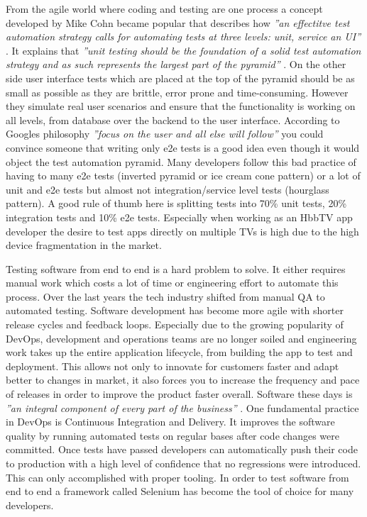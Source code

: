 From the agile world where coding and testing are one process a concept developed by Mike Cohn
became popular that describes how \textit{''an effectitve test automation strategy calls for
automating tests at three levels: unit, service an UI''} \cite{testautomation}. It explains
that \textit{''unit testing should be the foundation of a solid test automation strategy and as
such represents the largest part of the pyramid''} \cite{unittesting}. On the other side
user interface tests which are placed at the top of the pyramid should be as small as possible
as they are brittle, error prone and time-consuming. However they simulate real user scenarios
and ensure that the functionality is working on all levels, from database over the backend
to the user interface. According to Googles philosophy \textit{''focus on the user and all
else will follow''} you could convince someone that writing only e2e tests is a good idea
even though it would object the test automation pyramid. Many developers follow this bad
practice of having to many e2e tests (inverted pyramid or ice cream cone pattern) or a lot
of unit and e2e tests but almost not integration/service level tests (hourglass pattern). A good
rule of thumb here is splitting tests into 70\% unit tests, 20\% integration tests and 10\%
e2e tests. Especially when working as an HbbTV app developer the desire to test apps directly
on multiple TVs is high due to the high device fragmentation in the market.

Testing software from end to end is a hard problem to solve. It either requires manual work
which costs a lot of time or engineering effort to automate this process. Over the last
years the tech industry shifted from manual QA to automated testing. Software development
has become more agile with shorter release cycles and feedback loops. Especially due to the
growing popularity of DevOps, development and operations teams are no longer soiled and
engineering work takes up the entire application lifecycle, from building the app to test and
deployment. This allows not only to innovate for customers faster and adapt better to changes
in market, it also forces you to increase the frequency and pace of releases in order to
improve the product faster overall. Software these days is \textit{''an integral component
of every part of the business''} \cite{devops}. One fundamental practice in DevOps is
Continuous Integration and Delivery. It improves the software quality by running automated
tests on regular bases after code changes were committed. Once tests have passed developers
can automatically push their code to production with a high level of confidence that no
regressions were introduced. This can only accomplished with proper tooling. In order to test
software from end to end a framework called Selenium has become the tool of choice for many
developers.

